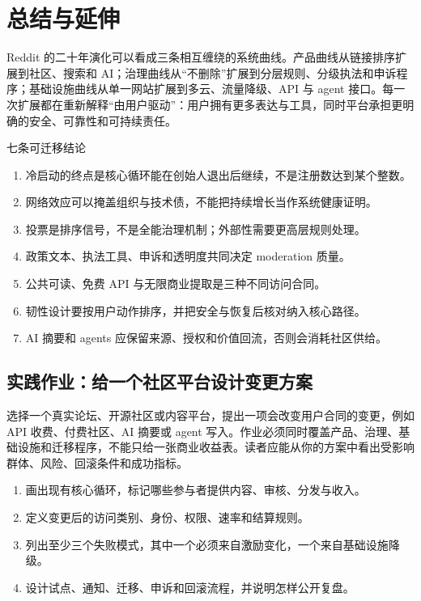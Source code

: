 \section{总结与延伸}

Reddit 的二十年演化可以看成三条相互缠绕的系统曲线。产品曲线从链接排序扩展到社区、搜索和 AI；治理曲线从“不删除”扩展到分层规则、分级执法和申诉程序；基础设施曲线从单一网站扩展到多云、流量降级、API 与 agent 接口。每一次扩展都在重新解释“由用户驱动”：用户拥有更多表达与工具，同时平台承担更明确的安全、可靠性和可持续责任。

\begin{importantbox}{七条可迁移结论}
\begin{enumerate}
  \item 冷启动的终点是核心循环能在创始人退出后继续，不是注册数达到某个整数。
  \item 网络效应可以掩盖组织与技术债，不能把持续增长当作系统健康证明。
  \item 投票是排序信号，不是全能治理机制；外部性需要更高层规则处理。
  \item 政策文本、执法工具、申诉和透明度共同决定 moderation 质量。
  \item 公共可读、免费 API 与无限商业提取是三种不同访问合同。
  \item 韧性设计要按用户动作排序，并把安全与恢复后核对纳入核心路径。
  \item AI 摘要和 agents 应保留来源、授权和价值回流，否则会消耗社区供给。
\end{enumerate}
\end{importantbox}

\subsection{实践作业：给一个社区平台设计变更方案}

选择一个真实论坛、开源社区或内容平台，提出一项会改变用户合同的变更，例如 API 收费、付费社区、AI 摘要或 agent 写入。作业必须同时覆盖产品、治理、基础设施和迁移程序，不能只给一张商业收益表。读者应能从你的方案中看出受影响群体、风险、回滚条件和成功指标。

\begin{enumerate}
  \item 画出现有核心循环，标记哪些参与者提供内容、审核、分发与收入。
  \item 定义变更后的访问类别、身份、权限、速率和结算规则。
  \item 列出至少三个失败模式，其中一个必须来自激励变化，一个来自基础设施降级。
  \item 设计试点、通知、迁移、申诉和回滚流程，并说明怎样公开复盘。
\end{enumerate}

